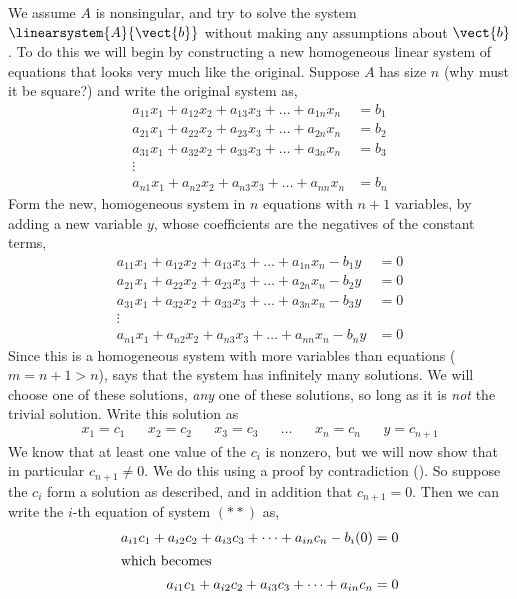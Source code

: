 We assume $A$ is nonsingular, and try to solve the system $\linearsystem{A}{\vect{b}}$ without making any assumptions about $\vect{b}$.  To do this we will begin by constructing a new homogeneous linear system of equations that looks very much like the original.  Suppose $A$ has size $n$ (why must it be square?) and write the original system as,
%
\begin{align*}
a_{11}x_1+a_{12}x_2+a_{13}x_3+\dots+a_{1n}x_n&=b_1\\
a_{21}x_1+a_{22}x_2+a_{23}x_3+\dots+a_{2n}x_n&=b_2\\
a_{31}x_1+a_{32}x_2+a_{33}x_3+\dots+a_{3n}x_n&=b_3\\
\vdots&\tag{$*$}\\
a_{n1}x_1+a_{n2}x_2+a_{n3}x_3+\dots+a_{nn}x_n&=b_n
\end{align*}
%
Form the new, homogeneous system in $n$ equations with $n+1$ variables, by adding a new variable $y$, whose coefficients are the negatives of the constant terms,
%
\begin{align*}
a_{11}x_1+a_{12}x_2+a_{13}x_3+\dots+a_{1n}x_n-b_1y&=0\\
a_{21}x_1+a_{22}x_2+a_{23}x_3+\dots+a_{2n}x_n-b_2y&=0\\
a_{31}x_1+a_{32}x_2+a_{33}x_3+\dots+a_{3n}x_n-b_3y&=0\\
\vdots&\tag{$**$}\\
a_{n1}x_1+a_{n2}x_2+a_{n3}x_3+\dots+a_{nn}x_n-b_ny&=0
\end{align*}
%
Since this is a homogeneous system with more variables than equations ($m=n+1>n$),  says that the system has infinitely many solutions.  We will choose one of these solutions, {\em any} one of these solutions, so long as it is {\em not} the trivial solution.  Write this solution as
%
\begin{align*}
x_1=c_1&&x_2=c_2&&x_3=c_3&&\ldots&&x_n=c_n&&y=c_{n+1}
\end{align*}
%
We know that at least one value of the $c_i$ is nonzero, but we will now show that in particular $c_{n+1}\neq 0$.  We do this using a proof by contradiction ().  So suppose the $c_i$ form a solution as described, and in addition that $c_{n+1}=0$.  Then we can write the $i$-th equation of system $(**)$ as,
%
\begin{align*}
a_{i1}c_1+a_{i2}c_2+a_{i3}c_3+\dots+a_{in}c_n-b_i(0)&=0\\
%
\intertext{which becomes}
%
a_{i1}c_1+a_{i2}c_2+a_{i3}c_3+\dots+a_{in}c_n&=0\\
\end{align*}
